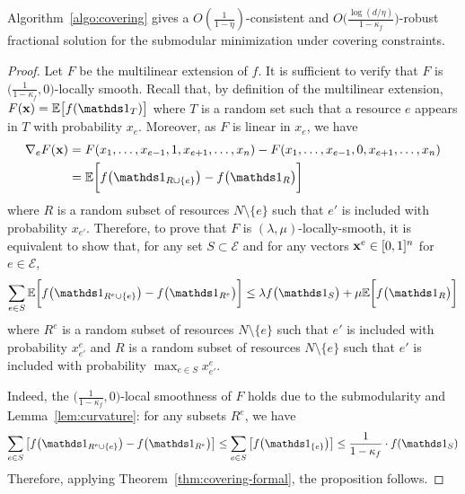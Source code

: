 \setcounter{theorem}{6}
\begin{proposition}
Algorithm~\ref{algo:covering} gives a
$O(\frac{1}{1 - \eta})$-consistent and $O\bigl( \frac{\log (d/\eta)}{1 - \kappa_{f}} \bigr)$-robust fractional  solution
for the submodular minimization under covering constraints.
\end{proposition}
\begin{proof}
Let $F$ be the multilinear extension of $f$.
It is sufficient to verify that $F$ is $\bigl(\frac{1}{1-\kappa_{f}},0\bigr)$-locally smooth.
Recall that, by definition of the multilinear extension,
$F(\vect{x}) = \mathbb{E} \bigl[ f(\one_{T})\bigr]$ where $T$ is a random set
such that a resource $e$ appears in $T$ with probability $x_{e}$. Moreover, as $F$ is linear in $x_{e}$, we have
%
\begin{align*}
\nabla_{e} F(\vect{x}) %
&= F(x_{1}, \ldots, x_{e-1}, 1, x_{e+1}, \ldots, x_{n}) - F(x_{1}, \ldots, x_{e-1}, 0, x_{e+1}, \ldots, x_{n}) \\
&= \mathbb{E} \biggl[ f\bigl(\one_{R \cup \{e\}}\bigr) - f\bigl(\one_{R}\bigr) \biggr]
\end{align*}
where $R$ is a random subset of resources $N \setminus \{e\}$ such that $e'$ is included with probability $x_{e'}$.
Therefore, to prove that $F$ is $(\lambda,\mu)$-locally-smooth, it is equivalent to show that,
for any set $S \subset \mathcal{E}$ and for any vectors $\mathbf{x}^{e} \in [0,1]^{n}$ for $e \in \mathcal{E}$,
%
\begin{equation*}	\label{eq:min-local-smooth-equiv}
\sum_{e \in S} \mathbb{E} \biggl[ f\bigl(\one_{R^{e} \cup \{e\}}\bigr) - f\bigl(\one_{R^{e}}\bigr) \biggr]
\leq \lambda f\bigl( \one_{S} \bigr) + \mu \mathbb{E} \biggl[ f\bigl(\one_{R}\bigr) \biggr]
\end{equation*}
%
where $R^{e}$ is a random subset of resources $N \setminus \{e\}$ such that $e'$ is included with probability $x^{e}_{e'}$
and $R$ is a random subset of resources $N \setminus \{e\}$ such that $e'$ is included with probability $\max_{e \in S} x^{e}_{e'}$.

Indeed, the
$\bigl(\frac{1}{1-\kappa_{f}},0\bigr)$-local smoothness of $F$ holds due to the submodularity and Lemma~\ref{lem:curvature}:
for any subsets $R^{e}$, we have
\begin{align*}
	\sum_{e \in S} \left[ f\bigl(\one_{R^{e} \cup \{e\}}\bigr) - f\bigl(\one_{R^{e}}\bigr) \right]
		\leq \sum_{e \in S} \left[ f\bigl(\one_{\{e\}}\bigr) \right]
		\leq \frac{1}{1 -\kappa_{f}} \cdot f(\one_{S})
\end{align*}
Therefore, applying Theorem~\ref{thm:covering-formal}, the proposition follows.
\end{proof}
